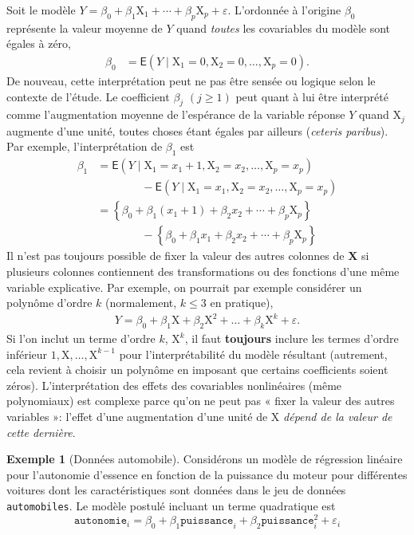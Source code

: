 \documentclass[
  11pt,
  letterpaper,
]{article}
\theoremstyle{definition}
\theoremstyle{definition}
\newtheorem{example}{Exemple}[section]
\theoremstyle{definition}
\theoremstyle{remark}
\begin{document}
Soit le modèle \(Y= \beta_0 + \beta_1 \mathrm{X}_1 + \cdots + \beta_p\mathrm{X}_p + \varepsilon\). L'ordonnée à l'origine \(\beta_0\) représente la valeur moyenne de \(Y\) quand \emph{toutes} les covariables du modèle sont égales à zéro,
\begin{align*}
\beta_0 &= \mathsf{E}(Y \mid \mathrm{X}_1=0,\mathrm{X}_2=0,\ldots,\mathrm{X}_p=0).
\end{align*}
De nouveau, cette interprétation peut ne pas être sensée ou logique selon le contexte de l'étude. Le coefficient \(\beta_j\) \((j \geq 1)\) peut quant à lui être interprété comme l'augmentation moyenne de l'espérance de la variable réponse \(Y\) quand \(\mathrm{X}_j\) augmente d'une unité, toutes choses étant égales par ailleurs (\emph{ceteris paribus}). Par exemple, l'interprétation de \(\beta_1\) est
\begin{align*}
\beta_1 &= \mathsf{E}(Y \mid \mathrm{X}_1=x_1+1,\mathrm{X}_2=x_2,\ldots,\mathrm{X}_p=x_p) \\
& \qquad \qquad - \mathsf{E}(Y \mid \mathrm{X}_1=x_1,\mathrm{X}_2=x_2,\ldots,\mathrm{X}_p=x_p) \\
&= \left\{\beta_0 + \beta_1 (x_1+1) + \beta_2 x_2 + \cdots +\beta_p \mathrm{X}_p \right\} \\
& \qquad \qquad -\left\{\beta_0 + \beta_1 x_1 + \beta_2 x_2 + \cdots +\beta_p \mathrm{X}_p \right\} 
\end{align*}
Il n'est pas toujours possible de fixer la valeur des autres colonnes de \(\mathbf{X}\) si plusieurs colonnes contiennent des transformations ou des fonctions d'une même variable explicative. Par exemple, on pourrait par exemple considérer un polynôme d'ordre \(k\) (normalement, \(k\leq 3\) en pratique),
\begin{align*}
Y=\beta_0+ \beta_1 \mathrm{X}+ \beta_2 \mathrm{X}^2 + \ldots +\beta_k \mathrm{X}^k + \varepsilon.
\end{align*}
Si l'on inclut un terme d'ordre \(k\), \(\mathrm{X}^k\), il faut \textbf{toujours} inclure les termes d'ordre inférieur \(1, \mathrm{X}, \ldots, \mathrm{X}^{k-1}\) pour l'interprétabilité du modèle résultant (autrement, cela revient à choisir un polynôme en imposant que certains coefficients soient zéros). L'interprétation des effets des covariables nonlinéaires (même polynomiaux) est complexe parce qu'on ne peut pas « fixer la valeur des autres variables »: l'effet d'une augmentation d'une unité de \(\mathrm{X}\) \emph{dépend de la valeur de cette dernière}.

\begin{example}[Données automobile]
\protect\hypertarget{exm:automobile}{}{\label{exm:automobile} {} }Considérons un modèle de régression linéaire pour l'autonomie d'essence en fonction de la puissance du moteur pour différentes voitures dont les caractéristiques sont données dans le jeu de données \texttt{automobiles}. Le modèle postulé incluant un terme quadratique est
\[
\texttt{autonomie}_i = \beta_0 + \beta_1 \texttt{puissance}_i + \beta_2 \texttt{puissance}_i^2 + \varepsilon_i
\]
\end{example}
\end{document}

